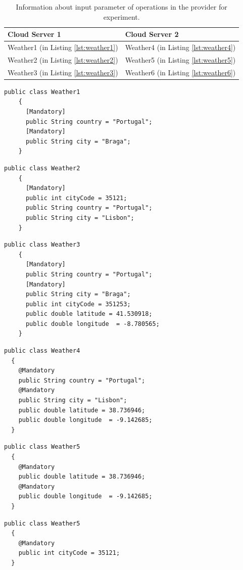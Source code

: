\begin{table}
\centering
\begin{tabular}{ p{5.50cm} p{5.50cm}}
\toprule
\multicolumn{1}{l}{\textbf{Cloud Server 1}} & \textbf{Cloud Server 2} \\
\midrule
Weather1 (in Listing \ref{lst:weather1}) & Weather4 (in Listing \ref{lst:weather4}) \\
\rowcolor{Gray}
Weather2 (in Listing \ref{lst:weather2}) & Weather5 (in Listing \ref{lst:weather5}) \\
Weather3 (in Listing \ref{lst:weather3}) & Weather6 (in Listing \ref{lst:weather6}) \\
\bottomrule
\end{tabular}
\caption[Information about input parameter of operations in the provider for experiment.]{Information about input parameter of operations in the provider for experiment.}
\label{tab:providerinput}
\end{table}

\begin{lstlisting}[caption=Details of Weather Object, label=lst:weather1]
  public class Weather1
    {
      [Mandatory]
      public String country = "Portugal";
      [Mandatory]
      public String city = "Braga";
    }
\end{lstlisting}
\begin{lstlisting}[caption=Details of Weather2 Object, label=lst:weather2]
  public class Weather2
    {
      [Mandatory]
      public int cityCode = 35121;
      public String country = "Portugal";
      public String city = "Lisbon";
    }
\end{lstlisting}
\begin{lstlisting}[caption=Details of Weather3 Object, label=lst:weather3]
  public class Weather3
    {
      [Mandatory]
      public String country = "Portugal";
      [Mandatory]
      public String city = "Braga";
      public int cityCode = 351253;
      public double latitude = 41.530918;
      public double longitude  = -8.780565;
    }
\end{lstlisting}
\begin{lstlisting}[caption=Details of Weather4 Object, label=lst:weather4]
  public class Weather4
  {
    @Mandatory
    public String country = "Portugal";
    @Mandatory
    public String city = "Lisbon";
    public double latitude = 38.736946;
    public double longitude  = -9.142685;
  }
\end{lstlisting}
\begin{lstlisting}[caption=Details of Weather5 Object, label=lst:weather5]
  public class Weather5
  {
    @Mandatory
    public double latitude = 38.736946;
    @Mandatory
    public double longitude  = -9.142685;
  }
\end{lstlisting}
\begin{lstlisting}[caption=Details of Weather6 Object, label=lst:weather6]
  public class Weather5
  {
    @Mandatory
    public int cityCode = 35121;
  }
\end{lstlisting}


